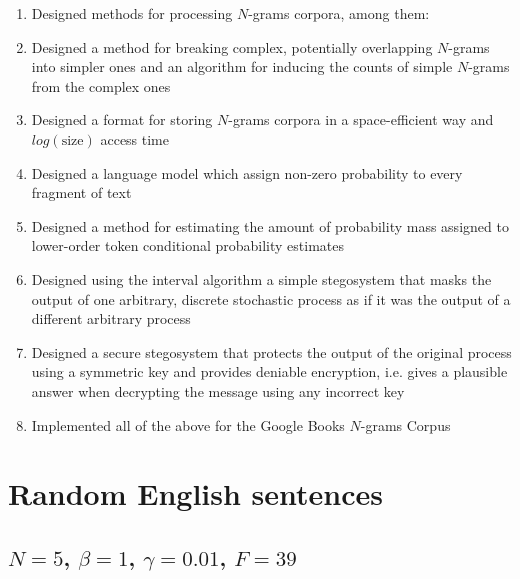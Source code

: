 \documentclass[draft]{IIBproject}
\makeatletter
\DeclareRobustCommand*{\ie}{i.e.\@\xspace}
\makeatother
\begin{document}
\begin{enumerate}
	\item Designed methods for processing $N$-grams corpora, among them:
	\item Designed a method for breaking complex, potentially overlapping $N$-grams into simpler ones and an algorithm for inducing the counts of simple $N$-grams from the complex ones
	\item Designed a format for storing $N$-grams corpora in a space-efficient way and $log(\text{size})$ access time
	\item Designed a language model which assign non-zero probability to every fragment of text
	\item Designed a method for estimating the amount of probability mass assigned to lower-order token conditional probability estimates
	\item Designed using the interval algorithm a simple stegosystem that masks the output of one arbitrary, discrete stochastic process as if it was the output of a different arbitrary process
	\item Designed a secure stegosystem that protects the output of the original process using a symmetric key and provides deniable encryption, \ie gives a plausible answer when decrypting the message using any incorrect key
	\item Implemented all of the above for the Google Books $N$-grams Corpus
\end{enumerate}

\clearpage
\footnotesize



\clearpage
\appendix
\section{Random English sentences}
\label{sec:random_english_sentences}

%
\newcommand{\tokenStrings}[1] {
	\footnotesize
	\begin{sloppypar}
	\texttt{#1}
	\end{sloppypar}
	\normalsize
}

\subsection{$N = 5$, $\beta = 1$, $\gamma = 0.01$, $F = 39$}
\end{document}
